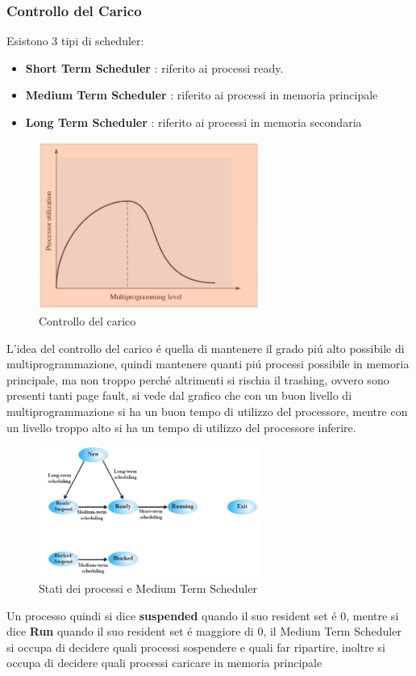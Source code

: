     \subsubsection{Controllo del Carico}
    Esistono 3 tipi di scheduler:
    \begin{itemize}
        \item \textbf{Short Term Scheduler} : riferito ai processi ready.
        \item \textbf{Medium Term Scheduler} : riferito ai processi in memoria principale
        \item \textbf{Long Term Scheduler} : riferito ai processi in memoria secondaria
    \end{itemize}
    \begin{figure}[H]
        \centering
        \includegraphics[width=0.65\textwidth]{immagini/MediumTermScheduler}
        \caption{Controllo del carico}
    \end{figure}
    L'idea del controllo del carico é quella di mantenere il grado piú alto possibile di multiprogrammazione, quindi
    mantenere quanti piú processi possibile in memoria principale, ma non troppo perché altrimenti si rischia il trashing,
    ovvero sono presenti tanti page fault, si vede dal grafico che con un buon livello di multiprogrammazione si ha
    un buon tempo di utilizzo del processore, mentre con un livello troppo alto si ha un tempo di utilizzo del processore
    inferire.
    \begin{figure}[H]
        \centering
        \includegraphics[width=0.65\textwidth]{immagini/ProcessiMediumTermScheduler}
        \caption{Stati dei processi e Medium Term Scheduler}
    \end{figure}
    Un processo quindi si dice \textbf{suspended} quando il suo resident set é 0, mentre si dice \textbf{Run}
    quando il suo resident set é maggiore di 0, il Medium Term Scheduler si occupa di decidere quali processi
    sospendere e quali far ripartire, inoltre si occupa di decidere quali processi caricare in memoria principale
